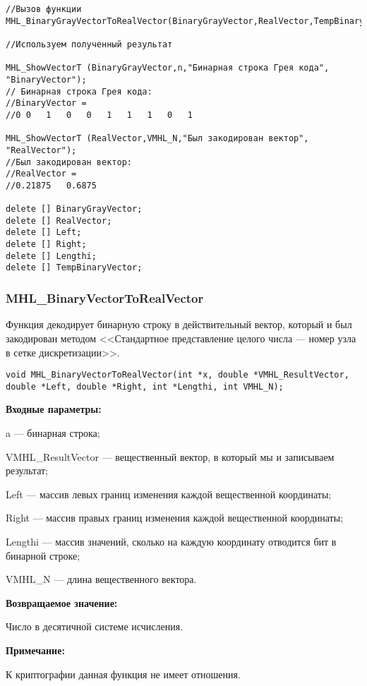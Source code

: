 \documentclass[a4paper,12pt]{article}
\begin{document}
\begin{lstlisting}[label=code_use_MHL_BinaryGrayVectorToRealVector,caption=Пример использования]
//Вызов функции
MHL_BinaryGrayVectorToRealVector(BinaryGrayVector,RealVector,TempBinaryVector,Left,Right,Lengthi,VMHL_N);

//Используем полученный результат

MHL_ShowVectorT (BinaryGrayVector,n,"Бинарная строка Грея кода", "BinaryVector");
// Бинарная строка Грея кода:
//BinaryVector =
//0	0	1	0	0	1	1	1	0	1

MHL_ShowVectorT (RealVector,VMHL_N,"Был закодирован вектор", "RealVector");
//Был закодирован вектор:
//RealVector =
//0.21875	0.6875

delete [] BinaryGrayVector;
delete [] RealVector;
delete [] Left;
delete [] Right;
delete [] Lengthi;
delete [] TempBinaryVector;
\end{lstlisting}

\subsubsection{MHL\_BinaryVectorToRealVector}\label{MHL_BinaryVectorToRealVector}

Функция декодирует бинарную строку в действительный вектор, который и был закодирован методом <<Стандартное представление целого числа --- номер узла в сетке дискретизации>>.


\begin{lstlisting}[label=code_syntax_MHL_BinaryVectorToRealVector,caption=Синтаксис]
void MHL_BinaryVectorToRealVector(int *x, double *VMHL_ResultVector, double *Left, double *Right, int *Lengthi, int VMHL_N);
\end{lstlisting}

\textbf{Входные параметры:}
 
a --- бинарная строка;
 
VMHL\_ResultVector --- вещественный вектор, в который мы и записываем результат;
 
Left --- массив левых границ изменения каждой вещественной координаты;
 
Right --- массив правых границ изменения каждой вещественной координаты;
 
Lengthi --- массив значений, сколько на каждую координату отводится бит в бинарной строке;
 
VMHL\_N --- длина вещественного вектора.

\textbf{Возвращаемое значение:}
 
Число в десятичной системе исчисления.

\textbf{Примечание:}

 К криптографии данная функция не имеет отношения.
 
\end{document}
